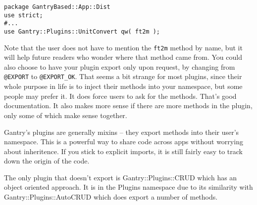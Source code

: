\begin{verbatim}
package GantryBased::App::Dist
use strict;
#...
use Gantry::Plugins::UnitConvert qw( ft2m );
\end{verbatim}

Note that the user does not have to mention the \verb+ft2m+ method by name,
but it will help future readers who wonder where that method came from.
You could also choose to have your plugin export only upon request, by
changing from \verb+@EXPORT+ to \verb+@EXPORT_OK+.  That seems a bit
strange for most plugins, since their whole purpose in life is to inject
their methods into your namespace, but some people may prefer it.  It does
force users to ask for the methods.  That's good documentation.  It also
makes more sense if there are more methods in the plugin, only some
of which make sense together.

Gantry's plugins are generally mixins -- they export methods into their
user's namespace.  This is a powerful way to share code across apps without
worrying about inheritence.  If you stick to explicit imports, it is still
fairly easy to track down the origin of the code.

The only plugin that doesn't export is Gantry::Plugins::CRUD which has
an object oriented approach.  It is in the Plugins namespace due to its
similarity with Gantry::Plugins::AutoCRUD which does export a number of
methods.
